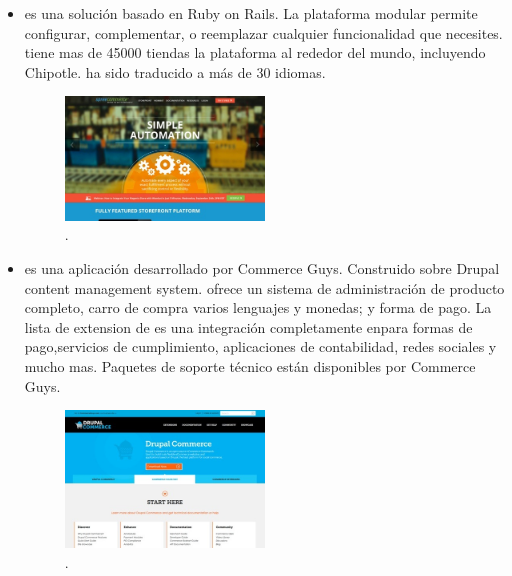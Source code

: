\begin{itemize}
	\item \textbf{\nameSpreeCommerce} es una solución \ecommerce \opensource  basado en Ruby on Rails. La plataforma modular permite configurar, complementar, o reemplazar cualquier funcionalidad que necesites. \nameSpreeCommerce tiene mas de 45000 tiendas la plataforma al rededor del mundo, incluyendo Chipotle\cite{online_Chipotle}. \nameSpreeCommerce ha sido traducido a más de 30 idiomas.

	\begin{figure}[H]
		\centering
		\includegraphics[width=0.5\textwidth]{figuras/cap1/SpreeCommerceWebsite.jpg}
		\caption{\nameSpreeCommerce \website\cite{online_SpreeCommerce}.}
	\end{figure}

	\item \textbf{\nameDrupalCommerce} es una aplicación \ecommerce desarrollado por Commerce Guys. Construido sobre Drupal content management system. \nameDrupalCommerce ofrece un sistema de administración de producto completo, carro de compra varios lenguajes y monedas; y forma de pago. La lista de extension de \nameDrupalCommerce es una integración completamente en\thirdParty para formas de pago,servicios de cumplimiento, aplicaciones de contabilidad, redes sociales y mucho mas. Paquetes de soporte técnico están disponibles por Commerce Guys.

	\begin{figure}[H]
		\centering
		\includegraphics[width=0.5\textwidth]{figuras/cap1/DrupalCommerceWebsite.jpg}
		\caption{\nameDrupalCommerce \website \cite{online_DrupalCommerce}.}
	\end{figure}


\end{itemize}
